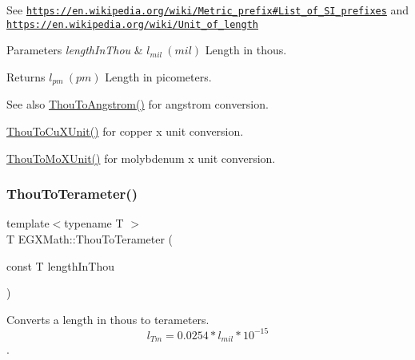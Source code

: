 See \href{https://en.wikipedia.org/wiki/Metric_prefix#List_of_SI_prefixes}{\tt https\+://en.\+wikipedia.\+org/wiki/\+Metric\+\_\+prefix\#\+List\+\_\+of\+\_\+\+S\+I\+\_\+prefixes} and \href{https://en.wikipedia.org/wiki/Unit_of_length}{\tt https\+://en.\+wikipedia.\+org/wiki/\+Unit\+\_\+of\+\_\+length} 
\begin{DoxyParams}{Parameters}
{\em length\+In\+Thou} & $ l_{mil}\ (mil)$ Length in thous. \\
\hline
\end{DoxyParams}
\begin{DoxyReturn}{Returns}
$ l_{pm}\ (pm)$ Length in picometers. 
\end{DoxyReturn}
\begin{DoxySeeAlso}{See also}
\mbox{\hyperlink{group___e_g_x_math-_conversions-_length_conversions-_imperial-_thou-_non-_s_i_ga5d852bdec8556e4b6bde1445f5f74a20}{Thou\+To\+Angstrom()}} for angstrom conversion. 

\mbox{\hyperlink{group___e_g_x_math-_conversions-_length_conversions-_imperial-_thou-_non-_s_i_ga5614deb555c0360dfdaa94d01ad35b17}{Thou\+To\+Cu\+X\+Unit()}} for copper x unit conversion. 

\mbox{\hyperlink{group___e_g_x_math-_conversions-_length_conversions-_imperial-_thou-_non-_s_i_ga3eb765800fa51e529878bdae4e997763}{Thou\+To\+Mo\+X\+Unit()}} for molybdenum x unit conversion. 
\end{DoxySeeAlso}
\mbox{\label{group___e_g_x_math-_conversions-_length_conversions-_imperial-_thou-_s_i_ga166a46a29a2a25eab620f82c43240878}} 
\subsubsection{\texorpdfstring{Thou\+To\+Terameter()}{ThouToTerameter()}}
{\footnotesize\ttfamily template$<$typename T $>$ \\
T E\+G\+X\+Math\+::\+Thou\+To\+Terameter (\begin{DoxyParamCaption}\item[{const T}]{length\+In\+Thou }\end{DoxyParamCaption})}



Converts a length in thous to terameters. \[ l_{Tm}=0.0254 * l_{mil} * 10^{-15} \]. 

